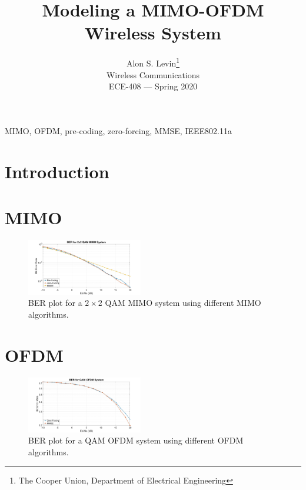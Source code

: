 \documentclass[journal]{IEEEtran}
\begin{document}
\title{Modeling a MIMO-OFDM Wireless System}
\author{Alon S. Levin\thanks{The Cooper Union, Department of Electrical Engineering}\\Wireless Communications\\ECE-408 --- Spring 2020}
\maketitle

\begin{abstract}

\end{abstract}

\begin{IEEEkeywords}
MIMO, OFDM, pre-coding, zero-forcing, MMSE, IEEE802.11a
\end{IEEEkeywords}

\section{Introduction}\label{sec:intro}

\section{MIMO} \label{sec:MIMO}

\begin{figure}[!htbp]
    \centering
    \includegraphics[width = 0.45\textwidth]{MIMO.jpg}
    \caption{BER plot for a $2\times2$ QAM MIMO system using different MIMO algorithms.}
    \label{fig:mimo_res}
\end{figure}

\section{OFDM} \label{sec:OFDM}

\begin{figure}[!htbp]
    \centering
    \includegraphics[width = 0.45\textwidth]{OFDM.jpg}
    \caption{BER plot for a QAM OFDM system using different OFDM algorithms.}
    \label{fig:ofdm_res}
\end{figure}
\end{document}
